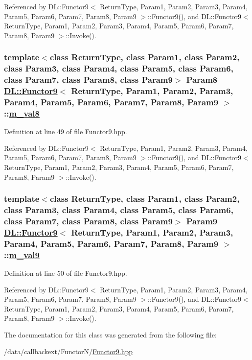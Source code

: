Referenced by DL::Functor9$<$ Return\-Type, Param1, Param2, Param3, Param4, Param5, Param6, Param7, Param8, Param9 $>$::Functor9(), and DL::Functor9$<$ Return\-Type, Param1, Param2, Param3, Param4, Param5, Param6, Param7, Param8, Param9 $>$::Invoke().\hypertarget{classDL_1_1Functor9_r8}{
\subsubsection[m\_\-val8]{\setlength{\rightskip}{0pt plus 5cm}template$<$class Return\-Type, class Param1, class Param2, class Param3, class Param4, class Param5, class Param6, class Param7, class Param8, class Param9$>$ Param8 \hyperlink{classDL_1_1Functor9}{DL::Functor9}$<$ Return\-Type, Param1, Param2, Param3, Param4, Param5, Param6, Param7, Param8, Param9 $>$::\hyperlink{classDL_1_1Functor9_r8}{m\_\-val8}}}
\label{classDL_1_1Functor9_r8}




Definition at line 49 of file Functor9.hpp.

Referenced by DL::Functor9$<$ Return\-Type, Param1, Param2, Param3, Param4, Param5, Param6, Param7, Param8, Param9 $>$::Functor9(), and DL::Functor9$<$ Return\-Type, Param1, Param2, Param3, Param4, Param5, Param6, Param7, Param8, Param9 $>$::Invoke().\hypertarget{classDL_1_1Functor9_r9}{
\subsubsection[m\_\-val9]{\setlength{\rightskip}{0pt plus 5cm}template$<$class Return\-Type, class Param1, class Param2, class Param3, class Param4, class Param5, class Param6, class Param7, class Param8, class Param9$>$ Param9 \hyperlink{classDL_1_1Functor9}{DL::Functor9}$<$ Return\-Type, Param1, Param2, Param3, Param4, Param5, Param6, Param7, Param8, Param9 $>$::\hyperlink{classDL_1_1Functor9_r9}{m\_\-val9}}}
\label{classDL_1_1Functor9_r9}




Definition at line 50 of file Functor9.hpp.

Referenced by DL::Functor9$<$ Return\-Type, Param1, Param2, Param3, Param4, Param5, Param6, Param7, Param8, Param9 $>$::Functor9(), and DL::Functor9$<$ Return\-Type, Param1, Param2, Param3, Param4, Param5, Param6, Param7, Param8, Param9 $>$::Invoke().

The documentation for this class was generated from the following file:\begin{CompactItemize}
\item 
/data/callbackext/Functor\-N/\hyperlink{Functor9_8hpp}{Functor9.hpp}\end{CompactItemize}
